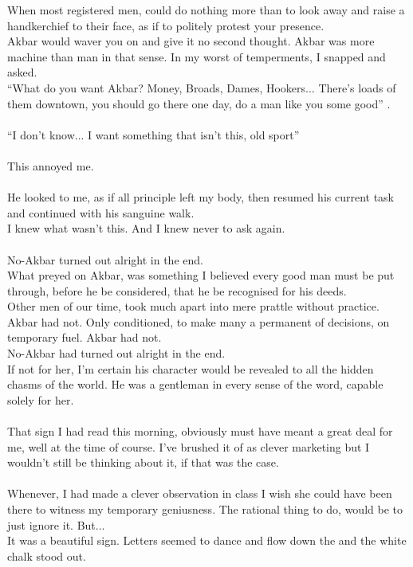 \documentclass{book}
\begin{document}
{{	When most registered men, could do nothing
	more than to look away
	and raise a handkerchief to their face, as if to politely protest your presence.\\
	Akbar would waver you on and give it no second thought.
	Akbar was more machine than man in that sense.
	In my worst of temperments, I snapped and
	asked. \\
	``What do you want Akbar?
	Money, Broads, Dames, Hookers... There's loads
	of them downtown, you should go there one day, do a man like you some good'' .\\\\
	``I don't know... I want something that isn't this, old sport''\\\\
	This annoyed me.\\\\
	He looked to me, as if all principle left my body, then resumed his current task and continued with his sanguine walk.\\
	I knew what wasn't this. And I knew never to ask again.\\\\
	No-Akbar turned out alright in the end.\\
	What preyed on Akbar, was something I believed every
	good man must be put through, before he be considered, that
	he be recognised for his deeds.\\
	Other men of our time, took much apart into mere prattle without
	practice. Akbar had not. Only conditioned, to make many a permanent
	of decisions, on temporary fuel. Akbar had not.\\
	No-Akbar had turned out alright in the end.\\
	If not for her, I'm certain his character would
	be revealed to all the hidden chasms of the world.
    He was a gentleman in every sense of the word, capable solely for her.\\\\
	That sign I had read this morning, obviously must have meant a great deal for me,
	well at the time of course. I've brushed it of as clever marketing but
	I wouldn't still be thinking about it, if that was the case.\\\\
	Whenever, I had made a clever observation in class I wish she could have been there to witness my temporary geniusness.
	The rational thing to do, would be to just ignore it. But...\\
	It was a beautiful sign. Letters seemed to dance and flow down the
	and the white chalk stood out.
	}}
\end{document}
